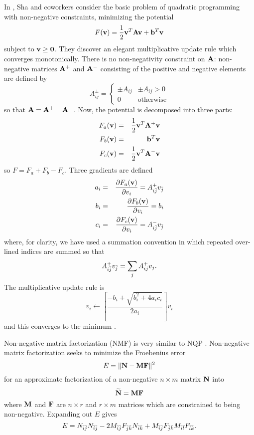 \documentclass[11pt,twocolumn]{IEEEtran}
\begin{document}
In \cite{ShaEtAl2003a,ShaEtAl2003b,ShaEtAl2007a}, Sha and coworkers
consider the basic problem of quadratic programming with non-negative
constraints, minimizing the potential
\begin{equation}
F({\bf v})=\frac{1}{2}{\bf v}^T{\bf A}{\bf v}+{\bf b}^T{\bf v}
\end{equation}
subject to ${\bf v}\ge {\bf 0}$. They discover an elegant
multiplicative update rule which converges monotonically. There is no
non-negativity constraint on ${\bf A}$: non-negative matrices ${\bf
  A}^+$ and ${\bf A}^-$ consisting of the positive and negative
elements are defined by
\begin{equation}\label{pm}
A^\pm_{ij}=\left\{\begin{array}{ll}\pm A_{ij}&\pm A_{ij}>0\\0&\mbox{otherwise}\end{array}\right.
\end{equation}
so that ${\bf A}={\bf A}^+-{\bf A}^-$. Now, the potential is decomposed into three parts:
\begin{eqnarray}
F_a({\bf v})&=&\frac{1}{2}{\bf v}^T{\bf A}^+{\bf v}\cr
F_b({\bf v})&=&{\bf b}^T{\bf v}\cr
F_c({\bf v})&=&\frac{1}{2}{\bf v}^T{\bf A}^-{\bf v}
\end{eqnarray}
so $F=F_a+F_b-F_c$.
Three gradients are defined
\begin{eqnarray}
a_i&=&\frac{\partial{F_a({\bf v})}}{{\partial v_i}}=A^+_{i{\bar{j}}}v_{{\bar{j}}}\cr
b_i&=&\frac{\partial{F_b({\bf v})}}{{\partial v_i}}=b_i\cr
c_i&=&\frac{\partial{F_c({\bf v})}}{{\partial v_i}}=A^-_{i{\bar{j}}}v_{\bar{j}}
\end{eqnarray}
where, for clarity, we have used a summation convention in which repeated over-lined indices are summed so that
\begin{equation}
A^+_{i{\bar{j}}}v_{{\bar{j}}}=\sum_j{A^+_{ij}v_{j}}.
\end{equation}
The multiplicative update rule is
\begin{equation}
v_i\leftarrow \left[\frac{-b_i+\sqrt{b_i^2+4a_ic_i}}{2a_i}\right]v_i
\end{equation}
and this converges to the minimum \cite{ShaEtAl2007a}.

Non-negative matrix factorization (NMF) is very similar to NQP \cite{LeeSeung1999a}. Non-negative matrix
factorization seeks to minimize the Froebenius error
\begin{equation}
E=\|{\bf N}-{\bf MF}\|^2
\end{equation}
for an approximate factorization of a non-negative $n\times m$ matrix
${\bf N}$ into 
\begin{equation}
\widetilde{{\bf N}}={\bf M}{\bf F}
\end{equation}
where ${\bf M}$ and ${\bf F}$ are $n\times r$ and $r\times m$ matrices
which are constrained to being non-negative. Expanding out $E$ gives
\begin{equation}
E=N_{{\bar{i}}{\bar{j}}}N_{{\bar{i}}{\bar{j}}}-2M_{{\bar{i}}{\bar{j}}}F_{{\bar{j}}{\bar{k}}}N_{{\bar{i}}{\bar{k}}}+M_{{\bar{i}}{\bar{j}}}F_{{\bar{j}}{\bar{k}}}M_{{\bar{i}}{\bar{l}}}F_{{\bar{l}}{\bar{k}}}.
\end{equation}
\end{document}

